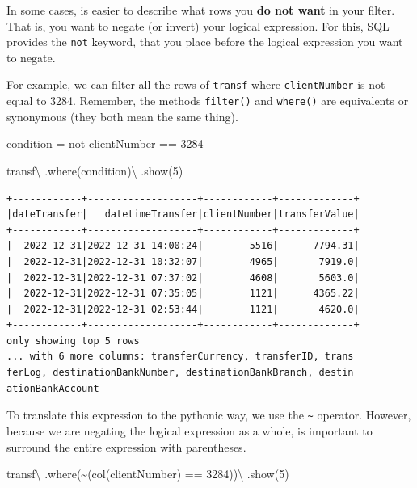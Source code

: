 \documentclass[
  11pt,
  letterpaper,
  DIV=11,
  numbers=noendperiod]{scrreprt}
\newenvironment{Shaded}{\begin{snugshade}}{\end{snugshade}}
\newcommand{\DecValTok}[1]{\textcolor[rgb]{0.68,0.00,0.00}{#1}}
\newcommand{\NormalTok}[1]{\textcolor[rgb]{0.00,0.23,0.31}{#1}}
\newcommand{\OperatorTok}[1]{\textcolor[rgb]{0.37,0.37,0.37}{#1}}
\newcommand{\StringTok}[1]{\textcolor[rgb]{0.13,0.47,0.30}{#1}}
\begin{document}
In some cases, is easier to describe what rows you \textbf{do not want}
in your filter. That is, you want to negate (or invert) your logical
expression. For this, SQL provides the \texttt{not} keyword, that you
place before the logical expression you want to negate.

For example, we can filter all the rows of \texttt{transf} where
\texttt{clientNumber} is not equal to 3284. Remember, the methods
\texttt{filter()} and \texttt{where()} are equivalents or synonymous
(they both mean the same thing).

\begin{Shaded}
\begin{Highlighting}[]
\NormalTok{condition }\OperatorTok{=} \StringTok{\textquotesingle{}\textquotesingle{}\textquotesingle{}}
\StringTok{  not clientNumber == 3284}
\StringTok{\textquotesingle{}\textquotesingle{}\textquotesingle{}}

\NormalTok{transf}\OperatorTok{\textbackslash{}}
\NormalTok{  .where(condition)}\OperatorTok{\textbackslash{}}
\NormalTok{  .show(}\DecValTok{5}\NormalTok{)}
\end{Highlighting}
\end{Shaded}

\begin{verbatim}
+------------+-------------------+------------+-------------+
|dateTransfer|   datetimeTransfer|clientNumber|transferValue|
+------------+-------------------+------------+-------------+
|  2022-12-31|2022-12-31 14:00:24|        5516|      7794.31|
|  2022-12-31|2022-12-31 10:32:07|        4965|       7919.0|
|  2022-12-31|2022-12-31 07:37:02|        4608|       5603.0|
|  2022-12-31|2022-12-31 07:35:05|        1121|      4365.22|
|  2022-12-31|2022-12-31 02:53:44|        1121|       4620.0|
+------------+-------------------+------------+-------------+
only showing top 5 rows
... with 6 more columns: transferCurrency, transferID, trans
ferLog, destinationBankNumber, destinationBankBranch, destin
ationBankAccount
\end{verbatim}

To translate this expression to the pythonic way, we use the
\texttt{\textasciitilde{}} operator. However, because we are negating
the logical expression as a whole, is important to surround the entire
expression with parentheses.

\begin{Shaded}
\begin{Highlighting}[]
\NormalTok{transf}\OperatorTok{\textbackslash{}}
\NormalTok{  .where(}\OperatorTok{\textasciitilde{}}\NormalTok{(col(}\StringTok{\textquotesingle{}clientNumber\textquotesingle{}}\NormalTok{) }\OperatorTok{==} \DecValTok{3284}\NormalTok{))}\OperatorTok{\textbackslash{}}
\NormalTok{  .show(}\DecValTok{5}\NormalTok{)}
\end{Highlighting}
\end{Shaded}
\end{document}
